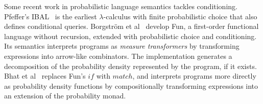 Some recent work in probabilistic language semantics tackles conditioning. Pfeffer's IBAL~\cite{cit:pfeffer-2007chapter-ibal} is the earliest $\lambda$-calculus with finite probabilistic choice that also defines conditional queries.
Borgstr\"om et al~\cite{cit:borgstrom-2011esop-measure-transformer} develop Fun, a first-order functional language without recursion, extended with probabilistic choice and conditioning.
Its semantics interprets programs as \emph{measure transformers} by transforming expressions into arrow-like combinators.
The implementation generates a decomposition of the probability density represented by the program, if it exists.
Bhat et al~\cite{cit:bhat-2013etaps-densities} replaces Fun's $if$ with $match$, and interprets programs more directly as probability density functions by compositionally transforming expressions into an extension of the probability monad.

